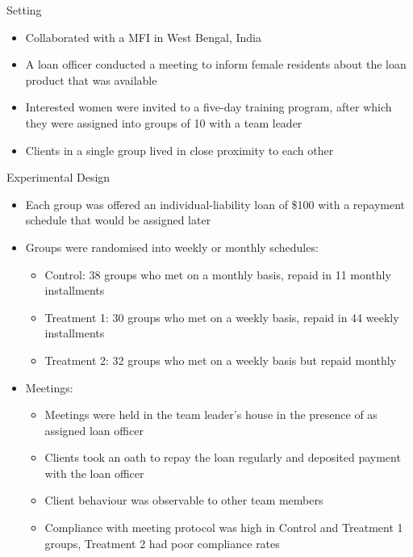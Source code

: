 \documentclass[11pt,notes=hide,aspectratio=169,mathserif]{beamer}
\begin{document}
\begin{frame}{Setting}

\begin{itemize}
\item Collaborated with a MFI in West Bengal, India 
\pause \item A loan officer conducted a meeting to inform female residents about the loan product that was available
\pause \item Interested women were invited to a five-day training program, after which they were assigned into groups of 10 with a team leader
\pause \item Clients in a single group lived in close proximity to each other
\end{itemize}
\end{frame}

\begin{frame}{Experimental Design}

\begin{itemize}
\item Each group was offered an individual-liability loan of \$100 with a repayment schedule that would be assigned later 
\pause \item Groups were randomised into weekly or monthly schedules:
\begin{itemize}
    \pause \item Control: 38 groups who met on a monthly basis, repaid in 11 monthly installments
    \pause \item Treatment 1: 30 groups who met on a weekly basis, repaid in 44 weekly installments
    \pause \item Treatment 2: 32 groups who met on a weekly basis but repaid monthly 
\end{itemize}
\pause \item Meetings:
\begin{itemize}
    \pause \item Meetings were held in the team leader's house in the presence of as assigned loan officer
    \pause \item Clients took an oath to repay the loan regularly and deposited payment with the loan officer 
    \pause \item Client behaviour was observable to other team members 
    \pause \item Compliance with meeting protocol was high in Control and Treatment 1 groups, Treatment 2 had poor compliance rates 
\end{itemize}
\end{itemize}
\end{frame}
\end{document}
